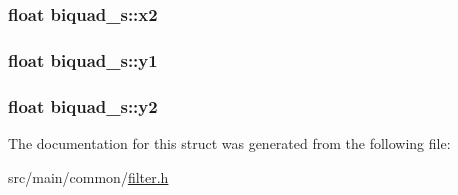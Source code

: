 \hypertarget{structbiquad__s_ab981dbea07294e6fe8a35f9e3b999a87}{
\subsubsection[{x2}]{\setlength{\rightskip}{0pt plus 5cm}float biquad\+\_\+s\+::x2}}\label{structbiquad__s_ab981dbea07294e6fe8a35f9e3b999a87}
\hypertarget{structbiquad__s_af071236ec3dfc181f966f5fe99421123}{
\subsubsection[{y1}]{\setlength{\rightskip}{0pt plus 5cm}float biquad\+\_\+s\+::y1}}\label{structbiquad__s_af071236ec3dfc181f966f5fe99421123}
\hypertarget{structbiquad__s_a2c4d8c8f4d1548d5e4d06521c9f303b4}{
\subsubsection[{y2}]{\setlength{\rightskip}{0pt plus 5cm}float biquad\+\_\+s\+::y2}}\label{structbiquad__s_a2c4d8c8f4d1548d5e4d06521c9f303b4}


The documentation for this struct was generated from the following file\+:\begin{DoxyCompactItemize}
\item 
src/main/common/\hyperlink{filter_8h}{filter.\+h}\end{DoxyCompactItemize}
